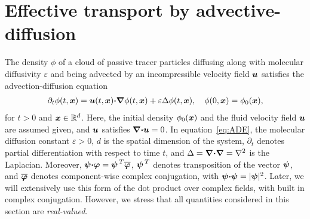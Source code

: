 \documentclass[amsa]{ipart}
\begin{document}
\section{Effective transport by
  advective-diffusion} \label{sec:Eff_Trans}    
%
The density $\phi$ of a cloud of passive tracer particles diffusing along
with molecular diffusivity $\varepsilon$ and being advected by an incompressible
velocity field $\boldsymbol{u}$ satisfies the advection-diffusion equation
%
\begin{align}\label{eq:ADE}
  \partial_t\phi(t,\vecx)
    =\vecu (t,\vecx)\bcdot\bnabla \phi(t,\vecx)+\varepsilon\Delta \phi(t,\vecx),
  \quad
  \phi(0,\vecx)=\phi_0(\vecx),  
\end{align}
%
for $t>0$ and $\boldsymbol{x}\in\mathbb{R}^d$.
Here, the initial density $\phi_0(\boldsymbol{x})$ and the fluid velocity field
$\boldsymbol{u}$ are assumed given, and $\boldsymbol{u}$ satisfies
$\mbox{\boldmath${\nabla}$}\mbox{\boldmath${\cdot}$}\boldsymbol{u}=0$. 
In equation~\eqref{eq:ADE}, the molecular diffusion constant $\varepsilon>0$,
$d$ is the spatial dimension of the 
system, $\partial_t$ denotes partial differentiation with respect to time
$t$, and $\Delta=\mbox{\boldmath${\nabla}$}\mbox{\boldmath${\cdot}$}\mbox{\boldmath${\nabla}$} =\nabla^2$ is the Laplacian. Moreover, 
$\boldsymbol{\psi}\mbox{\boldmath${\cdot}$}\boldsymbol{\varphi}=\boldsymbol{\psi}^{\,T}\overline{\boldsymbol{\varphi}}$,
$\boldsymbol{\psi}^{\,T}$ denotes transposition of the vector $\boldsymbol{\psi}$, and
$\overline{\boldsymbol{\varphi}}$ denotes component-wise complex conjugation,
with $\boldsymbol{\psi}\mbox{\boldmath${\cdot}$}\boldsymbol{\psi}=|\boldsymbol{\psi}|^2$. Later, we will extensively use this
form of the dot product over complex fields, with built in complex
conjugation. However, we stress that 
all quantities considered in this section are \emph{real-valued}.
\end{document}
